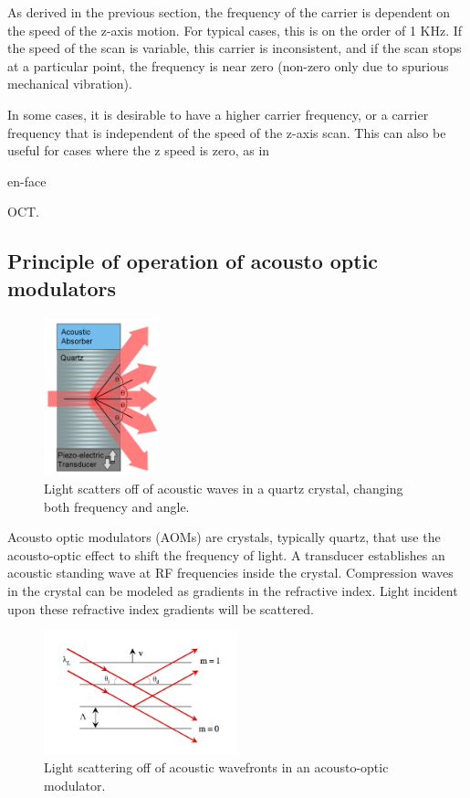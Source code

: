 As derived in the previous section, the frequency of the carrier is dependent on the speed of the z-axis motion. For typical cases, this is on the order of 1 KHz. If the speed of the scan is variable, this carrier is inconsistent, and if the scan stops at a particular point, the frequency is near zero (non-zero only due to spurious mechanical vibration).

In some cases, it is desirable to have a higher carrier frequency, or a carrier frequency that is independent of the speed of the z-axis scan. This can also be useful for cases where the z speed is zero, as in \begin{em}en-face\end{em} OCT. \cite{bouma} \cite{hitzenberger}

\subsection{Principle of operation of acousto optic modulators}

\begin{figure}[h!]
\centering
\includegraphics[width=0.3\textwidth]{Images/Background/aom.png}
\caption{Light scatters off of acoustic waves in a quartz crystal, changing both frequency and angle.}
\end{figure}

Acousto optic modulators (AOMs) are crystals, typically quartz, that use the acousto-optic effect to shift the frequency of light. A transducer establishes an acoustic standing wave at RF frequencies inside the crystal. Compression waves in the crystal can be modeled as gradients in the refractive index. Light incident upon these refractive index gradients will be scattered. \cite{haus}

\begin{figure}[h!]
\centering
\includegraphics[width=0.5\textwidth]{Images/Background/aom_scattering.png}
\caption{Light scattering off of acoustic wavefronts in an acousto-optic modulator.}
\end{figure}

